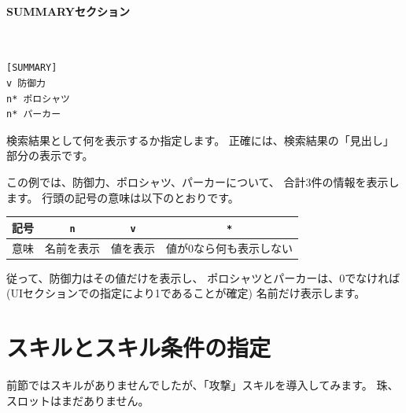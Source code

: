 \documentclass[dvipdfmx]{jsarticle}
\begin{document}
\paragraph{SUMMARYセクション}~\medskip
{\footnotesize\begin{mdframed}\begin{Verbatim}
[SUMMARY]
v 防御力
n* ポロシャツ
n* パーカー
\end{Verbatim}
\end{mdframed}}
\medskip

検索結果として何を表示するか指定します。
正確には、検索結果の「見出し」部分の表示です。

この例では、防御力、ポロシャツ、パーカーについて、
合計3件の情報を表示します。
行頭の記号の意味は以下のとおりです。
%
\begin{center}
\begin{tabular}{cccc}
\toprule
記号 & \texttt{n} &\texttt{v} & \texttt{*} \\
\midrule
意味 & 名前を表示 & 値を表示 & 値が0なら何も表示しない \\
\bottomrule
\end{tabular}
\end{center}
%
従って、防御力はその値だけを表示し、
ポロシャツとパーカーは、0でなければ
(UIセクションでの指定により1であることが確定) 名前だけ表示します。

\begin{center}
\end{center}

\section{スキルとスキル条件の指定} %
前節ではスキルがありませんでしたが、「攻撃」スキルを導入してみます。
珠、スロットはまだありません。
\end{document}
